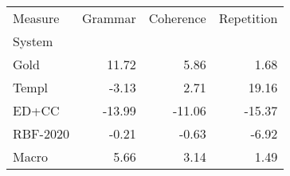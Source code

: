 \begin{tabular}{lrrr}
\toprule
Measure & Grammar & Coherence & Repetition \\
System &  &  &  \\
\midrule
Gold & 11.72 & 5.86 & 1.68 \\
Templ & -3.13 & 2.71 & 19.16 \\
ED+CC & -13.99 & -11.06 & -15.37 \\
RBF-2020 & -0.21 & -0.63 & -6.92 \\
Macro & 5.66 & 3.14 & 1.49 \\
\bottomrule
\end{tabular}
